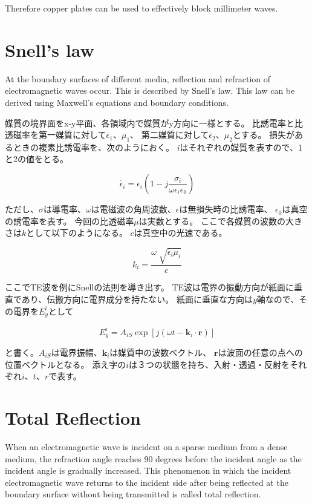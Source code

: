 \documentclass[a4paper,11pt]{jsarticle}
\begin{document}
Therefore copper plates can be used to effectively block millimeter waves.

\section{Snell's law}

At the boundary surfaces of different media, reflection and refraction of electromagnetic waves occur.
This is described by Snell's law.
This law can be derived using Maxwell's equations and boundary conditions.

媒質の境界面をx-y平面、各領域内で媒質がy方向に一様とする。
比誘電率と比透磁率を第一媒質に対して$\dot{\epsilon_1}$、$\mu_1$、
第二媒質に対して$\dot{\epsilon_2}$、$\mu_2$とする。
損失があるときの複素比誘電率を、次のようにおく。
$i$はそれぞれの媒質を表すので、1と2の値をとる。

\begin{equation}
  \dot{\epsilon_i} = \epsilon_i(1 - j\frac{\sigma_i}{\omega\epsilon_i\epsilon_0})
\end{equation}

ただし、$\sigma$は導電率、$\omega$は電磁波の角周波数、$\epsilon$は無損失時の比誘電率、
$\epsilon_0$は真空の誘電率を表す。
今回の比透磁率$\mu$は実数とする。
ここで各媒質の波数の大きさは$k$として以下のようになる。
$c$は真空中の光速である。

\begin{equation}
  k_i = \frac{\omega\sqrt[]{\dot{\epsilon_i}\mu_i}}{c}
\end{equation}

ここでTE波を例にSnellの法則を導き出す。
TE波は電界の振動方向が紙面に垂直であり、伝搬方向に電界成分を持たない。
紙面に垂直な方向は$y$軸なので、その電界を$E^i_y$として

\begin{equation}
  E^i_y = A_{iS}\exp[j(\omega t - \boldsymbol{k}_i\cdot\boldsymbol{r})]
\end{equation}

と書く。$A_{iS}$は電界振幅、$\boldsymbol{k}_i$は媒質中の波数ベクトル、
$\boldsymbol{r}$は波面の任意の点への位置ベクトルとなる。
添え字の$i$は３つの状態を持ち、入射・透過・反射をそれぞれ$i$、$t$、$r$で表す。

\section{Total Reflection}

When an electromagnetic wave is incident on a sparse medium from a dense medium,
the refraction angle reaches 90 degrees before the incident angle
as the incident angle is gradually increased.
This phenomenon in which the incident electromagnetic wave
returns to the incident side after being reflected
at the boundary surface without being transmitted is called total reflection.
\end{document}
